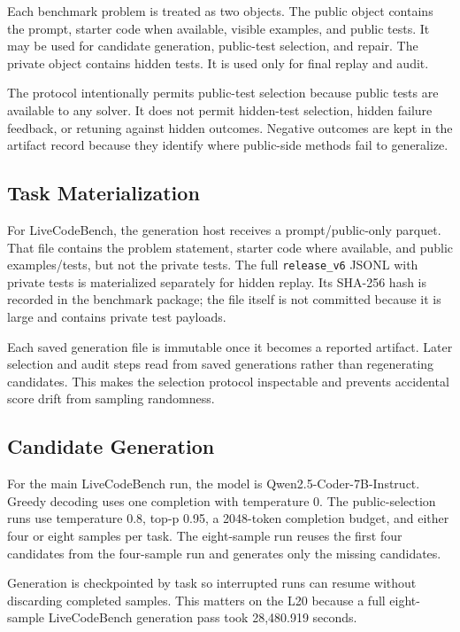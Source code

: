 \documentclass[11pt]{article}
\begin{document}
Each benchmark problem is treated as two objects. The public object contains the
prompt, starter code when available, visible examples, and public tests. It may
be used for candidate generation, public-test selection, and repair. The private
object contains hidden tests. It is used only for final replay and audit.

The protocol intentionally permits public-test selection because public tests
are available to any solver. It does not permit hidden-test selection, hidden
failure feedback, or retuning against hidden outcomes. Negative outcomes are
kept in the artifact record because they identify where public-side methods fail
to generalize.

\subsection{Task Materialization}

For LiveCodeBench, the generation host receives a prompt/public-only parquet.
That file contains the problem statement, starter code where available, and
public examples/tests, but not the private tests. The full
\texttt{release\_v6} JSONL with private tests is materialized separately for
hidden replay. Its SHA-256 hash is recorded in the benchmark package; the file
itself is not committed because it is large and contains private test payloads.

Each saved generation file is immutable once it becomes a reported artifact.
Later selection and audit steps read from saved generations rather than
regenerating candidates. This makes the selection protocol inspectable and
prevents accidental score drift from sampling randomness.

\subsection{Candidate Generation}

For the main LiveCodeBench run, the model is Qwen2.5-Coder-7B-Instruct. Greedy
decoding uses one completion with temperature 0. The public-selection runs use
temperature 0.8, top-p 0.95, a 2048-token completion budget, and either four or
eight samples per task. The eight-sample run reuses the first four candidates
from the four-sample run and generates only the missing candidates.

Generation is checkpointed by task so interrupted runs can resume without
discarding completed samples. This matters on the L20 because a full
eight-sample LiveCodeBench generation pass took 28,480.919 seconds.
\end{document}
